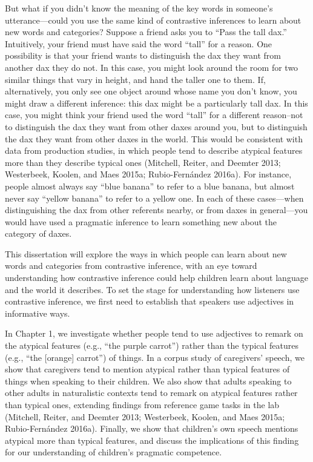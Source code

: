 \documentclass{ucetd}
\begin{document}
But what if you didn't know the meaning of the key words in someone's
utterance---could you use the same kind of contrastive inferences to
learn about new words and categories? Suppose a friend asks you to
``Pass the tall dax.'' Intuitively, your friend must have said the word
``tall'' for a reason. One possibility is that your friend wants to
distinguish the dax they want from another dax they do not. In this
case, you might look around the room for two similar things that vary in
height, and hand the taller one to them. If, alternatively, you only see
one object around whose name you don't know, you might draw a different
inference: this dax might be a particularly tall dax. In this case, you
might think your friend used the word ``tall'' for a different
reason--not to distinguish the dax they want from other daxes around
you, but to distinguish the dax they want from other daxes in the world.
This would be consistent with data from production studies, in which
people tend to describe atypical features more than they describe
typical ones (Mitchell, Reiter, and Deemter 2013; Westerbeek, Koolen,
and Maes 2015a; Rubio-Fernández 2016a). For instance, people almost
always say ``blue banana'' to refer to a blue banana, but almost never
say ``yellow banana'' to refer to a yellow one. In each of these
cases---when distinguishing the dax from other referents nearby, or from
daxes in general---you would have used a pragmatic inference to learn
something new about the category of daxes.

This dissertation will explore the ways in which people can learn about
new words and categories from contrastive inference, with an eye toward
understanding how contrastive inference could help children learn about
language and the world it describes. To set the stage for understanding
how listeners use contrastive inference, we first need to establish that
speakers use adjectives in informative ways.

In Chapter 1, we investigate whether people tend to use adjectives to
remark on the atypical features (e.g., ``the purple carrot'') rather
than the typical features (e.g., ``the {[}orange{]} carrot'') of things.
In a corpus study of caregivers' speech, we show that caregivers tend to
mention atypical rather than typical features of things when speaking to
their children. We also show that adults speaking to other adults in
naturalistic contexts tend to remark on atypical features rather than
typical ones, extending findings from reference game tasks in the lab
(Mitchell, Reiter, and Deemter 2013; Westerbeek, Koolen, and Maes 2015a;
Rubio-Fernández 2016a). Finally, we show that children's own speech
mentions atypical more than typical features, and discuss the
implications of this finding for our understanding of children's
pragmatic competence.
\end{document}
